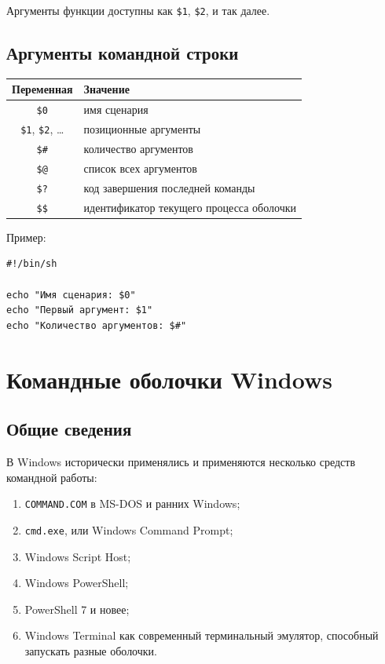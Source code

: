\documentclass[12pt,a4paper]{article}
\begin{document}
Аргументы функции доступны как \texttt{\$1}, \texttt{\$2}, и так далее.

\subsection{Аргументы командной строки}

\begin{center}
\begin{tabular}{|c|p{9cm}|}
\hline
Переменная & Значение \\
\hline
\texttt{\$0} & имя сценария \\
\texttt{\$1}, \texttt{\$2}, \ldots & позиционные аргументы \\
\texttt{\$\#} & количество аргументов \\
\texttt{\$@} & список всех аргументов \\
\texttt{\$?} & код завершения последней команды \\
\texttt{\$\$} & идентификатор текущего процесса оболочки \\
\hline
\end{tabular}
\end{center}

Пример:

\begin{lstlisting}
#!/bin/sh

echo "Имя сценария: $0"
echo "Первый аргумент: $1"
echo "Количество аргументов: $#"
\end{lstlisting}

\section{Командные оболочки Windows}

\subsection{Общие сведения}

В Windows исторически применялись и применяются несколько средств командной работы:
\begin{enumerate}
    \item \texttt{COMMAND.COM} в MS-DOS и ранних Windows;
    \item \texttt{cmd.exe}, или Windows Command Prompt;
    \item Windows Script Host;
    \item Windows PowerShell;
    \item PowerShell 7 и новее;
    \item Windows Terminal как современный терминальный эмулятор, способный запускать разные оболочки.
\end{enumerate}
\end{document}
